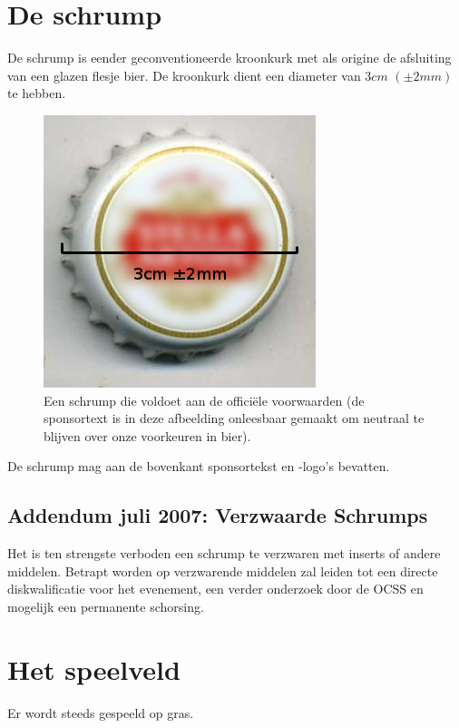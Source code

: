 \documentclass[a4paper,12pt,titlepage]{article}
\begin{document}
\newpage

\section{De schrump} \label{sec:schrump}

De schrump is eender geconventioneerde kroonkurk met als origine de afsluiting van een glazen flesje bier. De kroonkurk dient een diameter van $3cm$ $(\pm 2mm)$ te hebben.

\begin{figure}[h]
\centering
\includegraphics{schrump}
\caption{Een schrump die voldoet aan de offici\"ele voorwaarden (de sponsortext is in deze afbeelding onleesbaar gemaakt om neutraal te blijven over onze voorkeuren in bier).}
\label{fig:schrump}
\end{figure}

De schrump mag aan de bovenkant sponsortekst en -logo's bevatten.

\subsection*{Addendum juli 2007: Verzwaarde Schrumps}

Het is ten strengste verboden een schrump te verzwaren met inserts of andere middelen. Betrapt worden op verzwarende middelen zal leiden tot een directe diskwalificatie voor het evenement, een
verder onderzoek door de OCSS en mogelijk een permanente schorsing.

\newpage

\section{Het speelveld}

Er wordt steeds gespeeld op gras.
\end{document}
